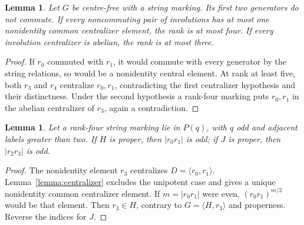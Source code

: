 \documentclass[11pt,a4paper]{article}
\newtheorem{lemma}[theorem]{Lemma}
\begin{document}
\begin{lemma}\label{lemma:rank}
Let $G$ be centre-free with a string marking. Its first two generators do
not commute. If every noncommuting pair of involutions has at most one
nonidentity common centralizer element, the rank is at most four. If every
involution centralizer is abelian, the rank is at most three.
\end{lemma}
\begin{proof}
If $r_0$ commuted with $r_1$, it would commute with every generator by the
string relations, so would be a nonidentity central element. At rank at
least five, both $r_3$ and $r_4$ centralize $r_0,r_1$, contradicting the
first centralizer hypothesis and their distinctness. Under the second
hypothesis a rank-four marking puts $r_0,r_1$ in the abelian centralizer
of $r_3$, again a contradiction.
\end{proof}

\begin{lemma}\label{lemma:odd}
Let a rank-four string marking lie in $P(q)$, with $q$ odd and adjacent
labels greater than two. If $H$ is proper, then $|r_0r_1|$ is odd; if
$J$ is proper, then $|r_2r_3|$ is odd.
\end{lemma}
\begin{proof}
The nonidentity element $r_3$ centralizes $D=\langle r_0,r_1\rangle$.
Lemma~\ref{lemma:centralizer} excludes the unipotent case and gives a
unique nonidentity common centralizer element. If $m=|r_0r_1|$ were even,
$(r_0r_1)^{m/2}$ would be that element. Then $r_3\in H$, contrary to
$G=\langle H,r_3\rangle$ and properness. Reverse the indices for $J$.
\end{proof}
\end{document}
